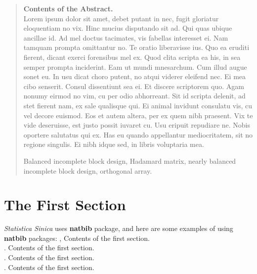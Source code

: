 \documentclass[12pt]{article} %
\renewcommand{\theequation}{\thesection\arabic{equation}}
\theoremstyle{definition}
\begin{document}
	\begin{quotation}
		{\bf Contents of the Abstract.}\\
		Lorem ipsum dolor sit amet, debet putant in nec, fugit gloriatur eloquentiam no vix. Hinc mucius disputando sit ad. Qui quas ubique ancillae id. Ad mel doctus tacimates, vis fabellas interesset ei.
		Nam tamquam prompta omittantur no. Te oratio liberavisse ius. Quo ea eruditi fierent, dicant exerci forensibus mel ex. Quod clita scripta ea his, in sea semper prompta inciderint. Eam ut mundi mnesarchum. Cum illud augue sonet eu.
		In usu dicat choro putent, no atqui viderer eleifend nec. Ei mea cibo senserit. Consul dissentiunt sea ei. Et discere scriptorem quo. Agam nonumy eirmod no vim, cu per odio abhorreant.
		Sit id scripta delenit, ad stet fierent nam, ex sale qualisque qui. Ei animal invidunt consulatu vis, cu vel decore euismod. Eos et autem altera, per ex quem nibh praesent. Vix te vide deseruisse, est justo possit iuvaret cu.
		Usu eripuit repudiare ne. Nobis oportere salutatus qui ex. Has eu quando appellantur mediocritatem, sit no regione singulis. Ei nibh idque sed, in libris voluptaria mea.
		
		
		\vspace{9pt}
		Balanced incomplete block design, Hadamard matrix, nearly balanced incomplete block design, orthogonal array.
		\par
	\end{quotation}\par
	
	
	
	\def\thefigure{\arabic{figure}}
	\def\thetable{\arabic{table}}
	
	\renewcommand{\theequation}{\thesection.\arabic{equation}}
	
	
	\fontsize{12}{14pt plus.8pt minus .6pt}\selectfont
	
	
	
	
	
	\section{ The First Section}
	
	{\it Statistica Sinica} uses {\bf natbib} package, and here are some examples of using {\bf natbib} packages:
	\cite{1988},
	Contents of the first section.\\
	\citet[Chap.~2]{1943}.
	Contents of the first section.\\
	\cite{Eubank}.
	Contents of the first section.\\
	\cite{Noakes}.
	Contents of the first section.\\
	
\end{document}
